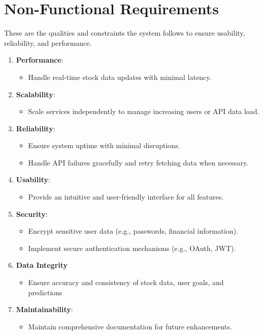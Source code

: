 \section{Non-Functional Requirements}
These are the qualities and constraints the system  follows to ensure usability, reliability, and performance.
\begin{enumerate}
    \item \textbf{Performance}:
    \begin{itemize}
        \item Handle real-time stock data updates with minimal latency.
    \end{itemize}
    \item \textbf{Scalability}:
    \begin{itemize}
        \item Scale services independently to manage increasing users or API data load.
    \end{itemize}
    \item \textbf{Reliability}:
    \begin{itemize}
        \item Ensure system uptime with minimal disruptions.
        \item Handle API failures gracefully and retry fetching data when necessary.
    \end{itemize}
    \item \textbf{Usability}:
    \begin{itemize}
        \item Provide an intuitive and user-friendly interface for all features.
    \end{itemize}
    \item \textbf{Security}:
    \begin{itemize}
        \item Encrypt sensitive user data (e.g., passwords, financial information).
        \item Implement secure authentication mechanisms (e.g., OAuth, JWT).
    \end{itemize}
    \item \textbf{Data Integrity}
    \begin{itemize}
        \item Ensure accuracy and consistency of stock data, user goals, and predictions
    \end{itemize}
    \item \textbf{Maintainability}:
    \begin{itemize}
        \item Maintain comprehensive documentation for future enhancements.
        
    \end{itemize}
\end{enumerate}